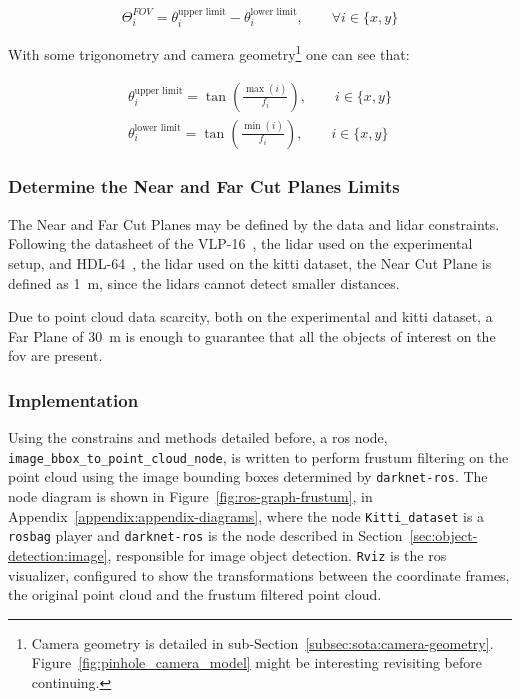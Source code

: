 \begin{equation}
	\label{eq:image-fov}
	\Theta^{FOV}_i = \theta^\text{upper limit}_i - \theta^\text{lower limit}_i, \qquad \forall i \in \{x, y\}
\end{equation}

With some trigonometry and camera geometry\footnote{Camera geometry is detailed in sub-Section~\ref{subsec:sota:camera-geometry}. Figure~\ref{fig:pinhole_camera_model} might be interesting revisiting before continuing.} one can see that:

\begin{align}
	\theta^\text{upper limit}_i = \tan\left(\frac{\max(i)}{f_i}\right), \qquad i \in \{x, y\} \\
	\theta^\text{lower limit}_i = \tan\left(\frac{\min(i)}{f_i}\right), \qquad i \in \{x, y\} 
\end{align}

\subsubsection{Determine the Near and Far Cut Planes Limits}
The Near and Far Cut Planes may be defined by the data and \ac{lidar} constraints. Following the datasheet of the VLP-16~\cite{VLP16}, the \ac{lidar} used on the experimental setup, and HDL-64~\cite{VelodyneHDL64}, the \ac{lidar} used on the \ac{kitti} dataset, the Near Cut Plane is defined as \SI{1}{\meter}, since the \acp{lidar} cannot detect smaller distances.

Due to point cloud data scarcity, both on the experimental and  \ac{kitti} dataset, a Far Plane of \SI{30}{\meter} is enough to guarantee that all the objects of interest on the \ac{fov} are present.

\subsubsection{Implementation}
Using the constrains and methods detailed before, a \ac{ros} node, \texttt{image\_bbox\_to\_point\_cloud\_node}, is written to perform frustum filtering on the point cloud using the image bounding boxes determined by \texttt{darknet-ros}. The node diagram is shown in Figure~\ref{fig:ros-graph-frustum}, in Appendix~\ref{appendix:appendix-diagrams}, where the node \texttt{Kitti\_dataset} is a \texttt{rosbag} player and \texttt{darknet-ros} is the node described in Section~\ref{sec:object-detection:image}, responsible for image object detection. \texttt{Rviz} is the \ac{ros} visualizer, configured to show the transformations between the coordinate frames, the original point cloud and the frustum filtered point cloud.

